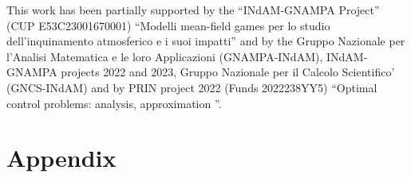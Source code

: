 \documentclass[smallextended,referee,envcountsect,]{svjour3}
\begin{document}
\begin{acknowledgements}
This work has been partially supported by the ``INdAM-GNAMPA Project'' (CUP E53C23001670001) ``Modelli mean-field games per lo studio dell'in\-qui\-na\-mento atmosferico e i suoi impatti'' and by the Gruppo Nazionale per l'Analisi Matematica e le loro Applicazioni (GNAMPA-INdAM), INdAM-GNAMPA projects 2022 and 2023, Gruppo Nazionale per il Calcolo Scientifico’ (GNCS-INdAM) and  by PRIN project 2022 (Funds 2022238YY5) “Optimal control problems: analysis, approximation ”.
\end{acknowledgements}

\appendix
\section{Appendix}
\label{app:A}

\end{document}
